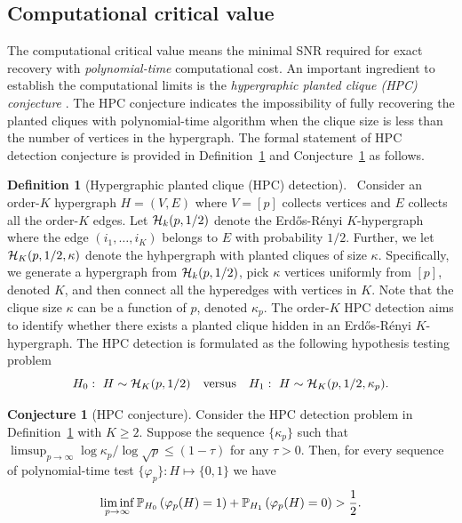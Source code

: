 \documentclass[journal]{IEEEtran}
\theoremstyle{definition}
\theoremstyle{definition}
\newtheorem{defn}{Definition}
\newtheorem{conjecture}{Conjecture}
\newcommand{\of}[1]{\left(#1\right)}
\begin{document}
\subsection{Computational critical value}\label{sec:complimit}
The computational critical value means the minimal SNR required for exact recovery with \emph{polynomial-time} computational cost. An important ingredient to establish the computational limits is the \emph{hypergraphic planted clique (HPC) conjecture} \citep{zhang2018tensor, brennan2020reducibility}. The HPC conjecture indicates the impossibility of fully recovering the planted cliques with polynomial-time algorithm when the clique size is less than the number of vertices in the hypergraph. The formal statement of HPC detection conjecture is provided in Definition~\ref{def:HPC} and Conjecture~\ref{hypo:HPC} as follows.  

\begin{defn}[Hypergraphic planted clique (HPC) detection]~\label{def:HPC}Consider an order-$K$ hypergraph $H = (V,E)$ where $V = [p]$ collects vertices and $E$ collects all the order-$K$ edges. Let $\mathcal{H}_k(p, 1/2)$ denote the Erd\H{o}s-R\'{e}nyi $K$-hypergraph where the edge $(i_1,\ldots, i_K)$ belongs to $E$ with probability $1/2$. Further, we let $\mathcal{H}_K(p, 1/2, \kappa)$ denote the hyhpergraph with planted cliques of size $\kappa$. Specifically, we generate a hypergraph from $\mathcal{H}_k(p, 1/2)$, pick $\kappa$ vertices uniformly from $[p]$, denoted $K$, and then connect all the hyperedges with vertices in $K$. Note that the clique size $\kappa$ can be a function of $p$, denoted $\kappa_p$. The order-$K$ HPC detection aims to identify whether there exists a planted clique hidden in an Erd\H{o}s-R\'{e}nyi $K$-hypergraph. The HPC detection is formulated as the following hypothesis testing problem
\begin{equation}
    H_0:\ H \sim \mathcal{H}_K(p,1/2) \quad \text{versus} \quad H_1: \ H \sim \mathcal{H}_K(p,1/2, \kappa_p).
\end{equation}
\end{defn}

\begin{conjecture}[HPC conjecture]\label{hypo:HPC} Consider the HPC detection problem in Definition~\ref{def:HPC} with $K \geq 2$. Suppose the sequence $\{\kappa_p\}$ such that $\limsup_{p \rightarrow \infty} \log \kappa_p/ \log \sqrt{p} \leq (1 - \tau)$ for any $\tau > 0$. Then, for every sequence of polynomial-time test $\{ \varphi_p\}: H \mapsto \{0,1\}$ we have 
\begin{equation}
    \liminf_{p \rightarrow \infty} \bbP_{H_0} \of{ \varphi_p(H) =1 } +  \bbP_{H_1} \of{ \varphi_p(H) =0} > \frac{1}{2}.
\end{equation}
\end{conjecture}
\end{document}
